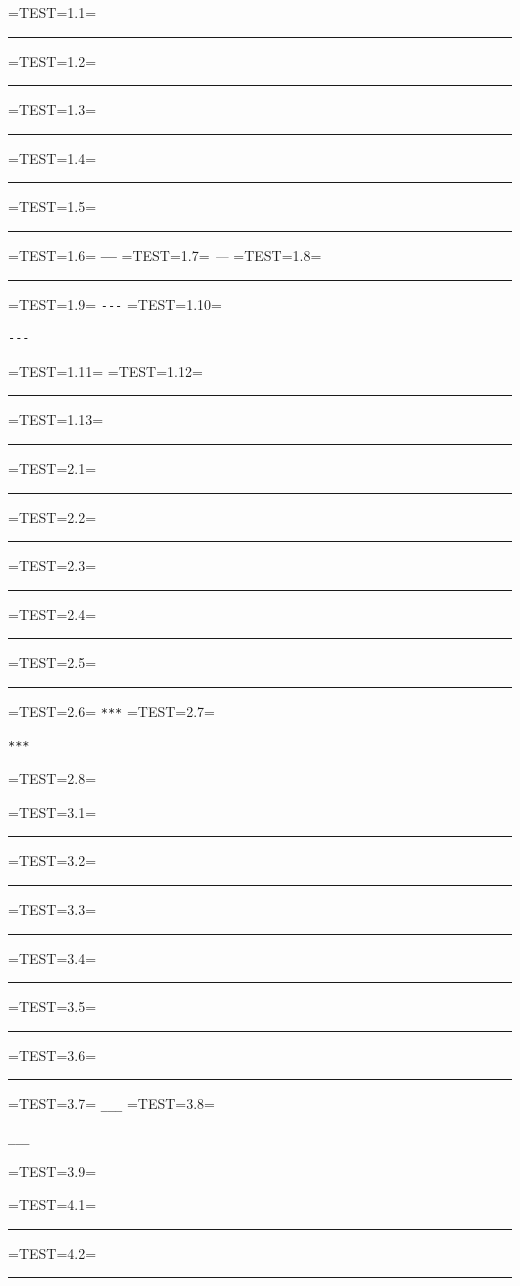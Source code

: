 \documentclass[a4paper]{article}
\begin{document}
=TEST=1.1=
\par\noindent\rule{\textwidth}{0.4pt}
=TEST=1.2=
\par\noindent\rule{\textwidth}{0.4pt}
=TEST=1.3=
\par\noindent\rule{\textwidth}{0.4pt}
=TEST=1.4=
\par\noindent\rule{\textwidth}{0.4pt}
=TEST=1.5=
\par\noindent\rule{\textwidth}{0.4pt}
=TEST=1.6=
\textbf{---}
=TEST=1.7=
\textit{---}
=TEST=1.8=
\par\noindent\rule{\textwidth}{0.4pt}
=TEST=1.9=
\verb`---`
=TEST=1.10=
\begin{verbatim}
---
\end{verbatim}
=TEST=1.11=
=TEST=1.12=
\par\noindent\rule{\textwidth}{0.4pt}
=TEST=1.13=
\par\noindent\rule{\textwidth}{0.4pt}

=TEST=2.1=
\par\noindent\rule{\textwidth}{0.4pt}
=TEST=2.2=
\par\noindent\rule{\textwidth}{0.4pt}
=TEST=2.3=
\par\noindent\rule{\textwidth}{0.4pt}
=TEST=2.4=
\par\noindent\rule{\textwidth}{0.4pt}
=TEST=2.5=
\par\noindent\rule{\textwidth}{0.4pt}
=TEST=2.6=
\verb`***`
=TEST=2.7=
\begin{verbatim}
***
\end{verbatim}
=TEST=2.8=


=TEST=3.1=
\par\noindent\rule{\textwidth}{0.4pt}
=TEST=3.2=
\par\noindent\rule{\textwidth}{0.4pt}
=TEST=3.3=
\par\noindent\rule{\textwidth}{0.4pt}
=TEST=3.4=
\par\noindent\rule{\textwidth}{0.4pt}
=TEST=3.5=
\par\noindent\rule{\textwidth}{0.4pt}
=TEST=3.6=
\par\noindent\rule{\textwidth}{0.4pt}
=TEST=3.7=
\verb`___`
=TEST=3.8=
\begin{verbatim}
___
\end{verbatim}
=TEST=3.9=


=TEST=4.1=
\par\noindent\rule{\textwidth}{0.4pt}

=TEST=4.2=
            \par\noindent\rule{\textwidth}{0.4pt}
             
\end{document}
